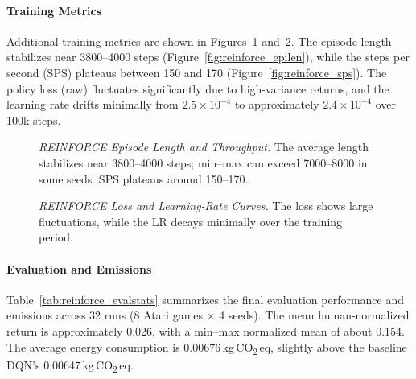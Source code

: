 \paragraph{Training Metrics}
Additional training metrics are shown in Figures~\ref{fig:reinforce_trainmetrics1} and~\ref{fig:reinforce_trainmetrics2}. The episode length stabilizes near \num{3800}–\num{4000} steps (Figure~\ref{fig:reinforce_epilen}), while the steps per second (SPS) plateaus between 150 and 170 (Figure~\ref{fig:reinforce_sps}). The policy loss (raw) fluctuates significantly due to high-variance returns, and the learning rate drifts minimally from $2.5\times10^{-4}$ to approximately $2.4\times10^{-4}$ over 100k steps.
\begin{figure}
	\centering
	\quad
	\caption{\textit{REINFORCE Episode Length and Throughput.} 
		The average length stabilizes near 3800–4000 steps; 
		min–max can exceed 7000–8000 in some seeds. 
		SPS plateaus around 150–170.}
	\label{fig:reinforce_trainmetrics1}
\end{figure}

\begin{figure}
	\centering
	\quad
	\caption{\textit{REINFORCE Loss and Learning‐Rate Curves.} 
		The loss shows large fluctuations, while the LR decays minimally over the training period.}
	\label{fig:reinforce_trainmetrics2}
\end{figure}

\paragraph{Evaluation and Emissions}
Table~\ref{tab:reinforce_evalstats} summarizes the final evaluation performance and emissions across 32 runs (8 Atari games $\times$ 4 seeds). The mean human‐normalized return is approximately \num{0.026}, with a min–max normalized mean of about 0.154. The average energy consumption is \num{0.00676}\,kg\,CO\textsubscript{2}\,eq, slightly above the baseline DQN's \num{0.00647}\,kg\,CO\textsubscript{2}\,eq.


